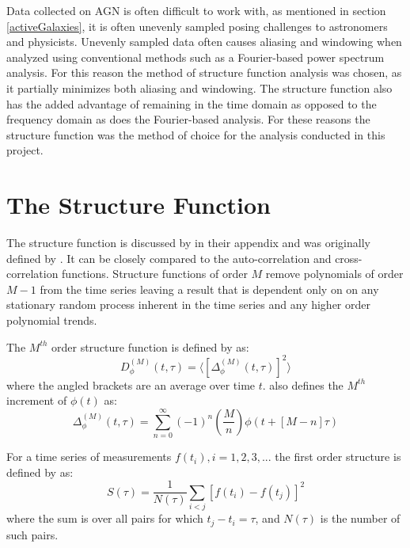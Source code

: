 \documentclass[12pt, oneside]{smuthesis}
\begin{document}
Data collected on AGN is often difficult to work with, as mentioned in section \ref{activeGalaxies}, it is often unevenly sampled posing challenges to astronomers and physicists. Unevenly sampled data often causes aliasing and windowing when analyzed using conventional methods such as a Fourier-based power spectrum analysis. For this reason the method of structure function analysis was chosen, as it partially minimizes both aliasing and windowing. The structure function also has the added advantage of remaining in the time domain as opposed to the frequency domain as does the Fourier-based analysis. For these reasons the structure function was the method of choice for the analysis conducted in this project.

\section{\sc The Structure Function} \label{structureFunction}

The structure function is discussed by \citep{cordes1985} in their appendix and was originally defined by \citep{rutman}. It can be closely compared to the auto-correlation and cross-correlation functions. Structure functions of order $M$ remove polynomials of order $M-1$ from the time series leaving a result that is dependent only on on any stationary random process inherent in the time series and any higher order polynomial trends.

The $M^{th}$ order structure function is defined by \cite{rutman} as:
\begin{equation} \label{eqn3.1}
D^{\left(M\right)}_{\phi}\left(t, \tau\right) = \langle\left[\Delta^{\left(M\right)}_{\phi}\left(t, \tau\right)\right]^{2}\rangle
\end{equation}
where the angled brackets are an average over time $t$. \cite{rutman} also defines the $M^{th}$ increment of $\phi\left(t\right)$ as:
\begin{equation} \label{eqn3.2}
\Delta^{\left(M\right)}_{\phi}\left(t, \tau\right) = \sum_{n=0}^{\infty}\left(-1\right)^{n}\left(\frac{M}{n}\right)\phi\left(t + \left[M - n\right]\tau\right)
\end{equation}

For a time series of measurements $f\left(t_{i}\right), i = 1,2,3,...$ the first order structure is defined by \citep{collier2001} as:
\begin{equation}
S\left(\tau\right) = \frac{1}{N\left(\tau\right)}\sum_{i<j}\left[f\left(t_{i}\right)-f\left(t_{j}\right)\right]^{2}
\end{equation}
where the sum is over all pairs for which $t_{j}-t_{i}=\tau$, and $N\left(\tau\right)$ is the number of such pairs.
\end{document}
